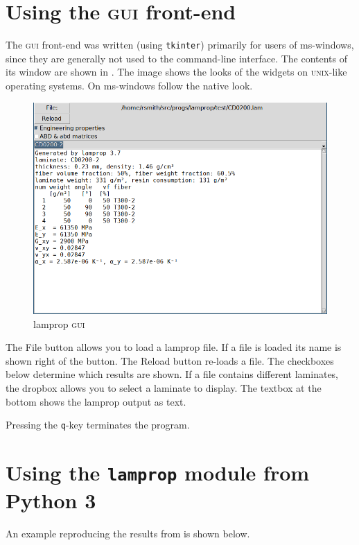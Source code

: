 \documentclass[a4paper,landscape,oneside,11pt,twocolumn]{memoir}
\begin{document}
\section{Using the \textsc{gui} front-end} %

The \textsc{gui} front-end was written (using \texttt{tkinter}) primarily for
users of ms-windows, since they are generally not used to the command-line
interface. The contents of its window are shown in . The
image shows the looks of the widgets on \textsc{unix}-like operating systems.
On ms-windows follow the native look.

\begin{figure}[!htbp]
  \centerline{\includegraphics[scale=1]{lamprop-gui.png}}
  \caption{\label{fig:lamprop-gui}lamprop \textsc{gui}}
\end{figure}

The \textsf{File} button allows you to load a lamprop file. If a file is
loaded its name is shown right of the button. The \textsf{Reload} button
re-loads a file. The checkboxes below determine which results are shown. If
a file contains different laminates, the dropbox allows you to select
a laminate to display. The textbox at the bottom shows the lamprop output as
text.

Pressing the \texttt{q}-key terminates the program.

\section{Using the \texttt{lamprop} module from Python 3} %

An example reproducing the results from  is shown
below.\\
\end{document}
